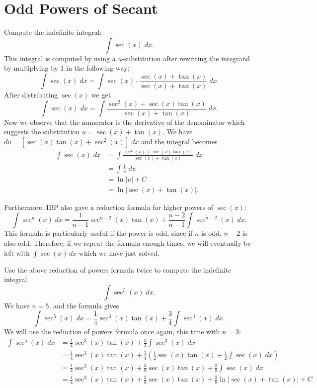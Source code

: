 \documentclass[handout]{ximera}
\begin{document}
\section{Odd Powers of Secant}
\begin{example}
Compute the indefinite integral:
\[
\int \sec(x) \; dx.
\]
This integral is computed by using a $u$-substitution after rewriting the integrand
by multiplying by 1 in the following way:
\[
\int \sec(x) \; dx = \int \sec(x) \cdot \frac{\sec(x) + \tan(x)}{\sec(x) + \tan(x)} \; dx.
\]
After distributing $\sec(x)$ we get
\[
\int \sec(x) \; dx = \int \frac{\sec^2(x) + \sec(x)\tan(x)}{\sec(x) + \tan(x)} \; dx.
\]
Now we observe that the numerator is the derivative of the denominator which suggests the substitution
$u = \sec(x) + \tan(x)$. We have $du = [ \sec(x)\tan(x) + \sec^2(x)] \; dx$ and the integral becomes
\begin{align*}
\int \sec(x) \; dx &= \int \frac{\sec^2(x) + \sec(x)\tan(x)}{\sec(x) + \tan(x)} \; dx\\
&= \int \frac{1}{u} \; du\\
&= \ln|u| + C\\
&= \ln|\sec(x) + \tan(x)|.
\end{align*}

\end{example}

Furthermore, IBP also gave a reduction formula for higher powers of $\sec(x)$:
\[
\int \sec^n(x) \; dx =  \frac{1}{n-1}\sec^{n-2}(x)\tan(x) + \frac{n-2}{n-1}\int \sec^{n-2}(x) \; dx. 
\]
This formula is particularly useful if
the power is odd, since if $n$ is odd, $n-2$ is also odd.  Therefore, if we repeat the formula enough times, 
we will eventually be left with $\int \sec(x) \, dx$
which we have just solved.

\begin{example}
Use the above reduction of powers formula twice to compute the indefinite integral
\[
\int \sec^5(x) \; dx.
\]
We have $n =5$, and the formula gives
\[
\int \sec^5(x) \; dx = \frac14 \sec^3(x)\tan(x) + \frac34 \int \sec^3(x) \; dx.
\]
We will use the reduction of powers formula once again, this time with $n=3$:
\begin{align*}
\int \sec^5(x) \; dx &= \frac14 \sec^3(x)\tan(x) + \frac34 \int \sec^3(x) \; dx\\
&= \frac14 \sec^3(x)\tan(x) + \frac34\left(\frac12\sec(x)\tan(x) + \frac12\int \sec(x) \; dx\right)\\
&=\frac14 \sec^3(x)\tan(x) + \frac38\sec(x)\tan(x) + \frac38 \int \sec(x) \; dx \\
&=\frac14 \sec^3(x)\tan(x) + \frac38\sec(x)\tan(x) + \frac38\ln|\sec(x) + \tan(x)| + C
\end{align*}
\end{example}
\end{document}
